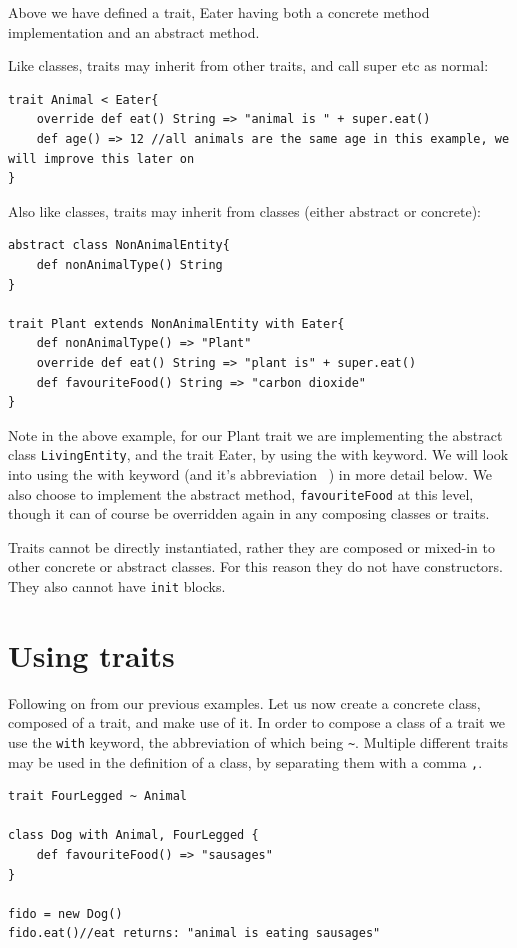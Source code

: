 \documentclass[conc-doc]{subfiles}
\begin{document}
Above we have defined a trait, Eater having both a concrete method implementation and an abstract method.

Like classes, traits may inherit from other traits, and call super etc as normal:
\begin{lstlisting}
trait Animal < Eater{
	override def eat() String => "animal is " + super.eat()
	def age() => 12 //all animals are the same age in this example, we will improve this later on
}
\end{lstlisting}

Also like classes, traits may inherit from classes (either abstract or concrete):

\begin{lstlisting}
abstract class NonAnimalEntity{
	def nonAnimalType() String
}

trait Plant extends NonAnimalEntity with Eater{
	def nonAnimalType() => "Plant"
	override def eat() String => "plant is" + super.eat()
	def favouriteFood() String => "carbon dioxide"
}
\end{lstlisting}

Note in the above example, for our Plant trait we are implementing the abstract class \lstinline{LivingEntity}, and the trait Eater, by using the with keyword. We will look into using the with keyword (and it's abbreviation ~) in more detail below. We also choose to implement the abstract method, \lstinline{favouriteFood} at this level, though it can of course be overridden again in any composing classes or traits.

Traits cannot be directly instantiated, rather they are composed or mixed-in to other concrete or abstract classes. For this reason they do not have constructors. They also cannot have \lstinline{init} blocks.

\section{Using traits}
Following on from our previous examples. Let us now create a concrete class, composed of a trait, and make use of it. In order to compose a class of a trait we use the \lstinline{with} keyword, the abbreviation of which being \lstinline{~}. Multiple different traits may be used in the definition of a class, by separating them with a comma \lstinline{,}.

\begin{lstlisting}
trait FourLegged ~ Animal

class Dog with Animal, FourLegged {
	def favouriteFood() => "sausages"
}

fido = new Dog()
fido.eat()//eat returns: "animal is eating sausages"
\end{lstlisting}
\end{document}
